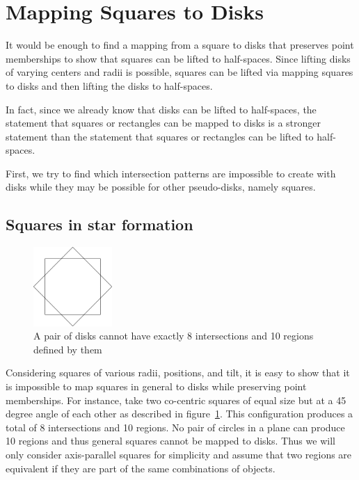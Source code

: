 \documentclass{NSF}
\begin{document}

\section{Mapping Squares to Disks}
It would be enough to find a mapping from a square to disks that preserves point memberships to show that squares can be lifted to half-spaces. Since lifting disks of varying centers and radii is possible, squares can be lifted via mapping squares to disks and then lifting the disks to half-spaces.

In fact, since we already know that disks can be lifted to half-spaces, the statement that squares or rectangles can be mapped to disks is a stronger statement than the statement that squares or rectangles can be lifted to half-spaces. 

First, we try to find which intersection patterns are impossible to create with disks while they may be possible for other pseudo-disks, namely squares.

\subsection{Squares in star formation}

\begin{figure}[ht]
\centering
\includegraphics[width=\textwidth,height=3cm,keepaspectratio]{images/cocentric-squares}
\caption{ A pair of disks cannot have exactly 8 intersections and 10 regions  defined by them }
\label{fig:cocentric-squares}
\end{figure}

Considering squares of various radii, positions, and tilt, it is easy to show that it is impossible to map squares in general to disks while preserving point memberships. For instance, take two co-centric squares of equal size but at a 45 degree angle of each other as described in figure~\ref{fig:cocentric-squares}. This configuration produces a total of 8 intersections and 10 regions. No pair of circles in a plane can produce 10 regions and thus general squares cannot be mapped to disks. Thus we will only consider axis-parallel squares for simplicity and assume that two regions are equivalent if they are part of the same combinations of objects.
\end{document}
